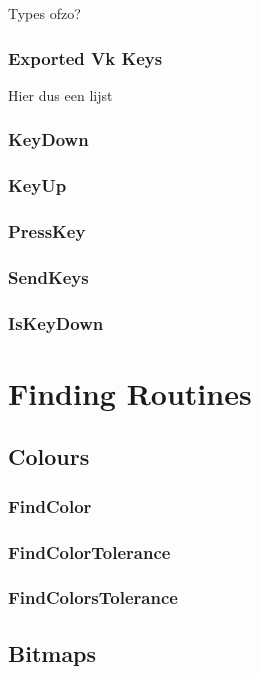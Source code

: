 \documentclass[a4paper]{report}
\begin{document}
Types ofzo?

\subsection{Exported Vk Keys}

Hier dus een lijst

\subsection{KeyDown}

\subsection{KeyUp}

\subsection{PressKey}

\subsection{SendKeys}

\subsection{IsKeyDown}

\chapter{Finding Routines}

\section{Colours}

\subsection{FindColor}

\subsection{FindColorTolerance}

\subsection{FindColorsTolerance}

\section{Bitmaps}
\end{document}
